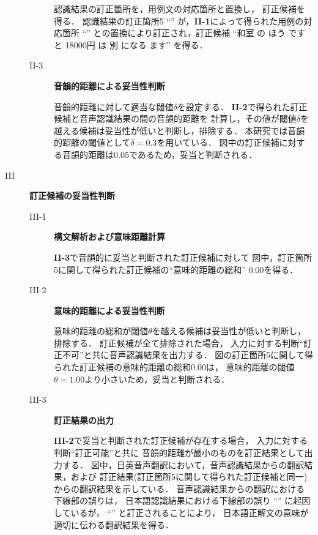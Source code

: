 \begin{description}
\begin{description}
認識結果の訂正箇所を，用例文の対応箇所と置換し，
訂正候補を得る．
認識結果の訂正箇所5 
``''
が，{\bf II-1}によって得られた用例の対応箇所
``''
との置換により訂正され，訂正候補
``和室 の ほう です と 18000円
  は 別 になる ます''
を得る．

    \item[II-3] {\bf 音韻的距離による妥当性判断}

音韻的距離に対して適当な閾値$\delta$を設定する．
{\bf II-2}で得られた訂正候補と音声認識結果の間の音韻的距離を
計算し，その値が閾値$\delta$を越える候補は妥当性が低いと判断し，排除する．
本研究では音韻的距離の閾値として$\delta = 0.3$を用いている．
図中の訂正候補に対する音韻的距離は$0.05$であるため，妥当と判断される．

  \end{description}

\item[III] {\bf 訂正候補の妥当性判断}

  \begin{description}

    \item[III-1] {\bf 構文解析および意味距離計算}

{\bf II-3}で音韻的に妥当と判断された訂正候補に対して
図中，訂正箇所5に関して得られた訂正候補の``意味的距離の総和''
$0.00$を得る．

    \item[III-2] {\bf 意味的距離による妥当性判断}

意味的距離の総和が閾値$\theta$を越える候補は妥当性が低いと判断し，排除する．
訂正候補が全て排除された場合，
入力に対する判断``訂正不可''と共に音声認識結果を出力する．
図の訂正箇所5に関して得られた訂正候補の意味的距離の総和$0.00$は，
意味的距離の閾値$\theta = 1.00$より小さいため，妥当と判断される．

    \item[III-3] {\bf 訂正結果の出力}

{\bf III-2}で妥当と判断された訂正候補が存在する場合，
入力に対する判断``訂正可能''と共に
音韻的距離が最小のものを訂正結果として出力する．
図中，日英音声翻訳において，音声認識結果からの翻訳結果，および
訂正結果(訂正箇所5に関して得られた訂正候補と同一)
からの翻訳結果を示している．
音声認識結果からの翻訳における下線部の誤りは，
日本語認識結果における下線部の誤り
``''
に起因しているが，
``''
と訂正されることにより，
日本語正解文の意味が適切に伝わる翻訳結果を得る．

  \end{description}
\end{description}

